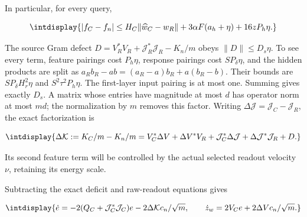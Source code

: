 
In particular, for every query,


\begingroup\renewcommand{\theHequation}{intdisplay.592}
\begin{equation}
\intdisplay{
|f_C-f_n|\le
 H_C\|\widehat w_C-w_R\|+3\alpha F(a_h+\eta)+16zP_h\eta.
}
\label{int:eq-0250-harmonic-query-output-difference}
\end{equation}
\endgroup


The source Gram defect \(D=V_R^*V_R+\mathcal J_R^*\mathcal J_R-K_n/m\) obeys \(\|D\|\le D_s\eta\). To see every term, feature pairings cost \(P_h\eta\), response pairings cost \(SP_\delta\eta\), and the hidden products are split as \(a_Rb_R-ab=(a_R-a)b_R+a(b_R-b)\). Their bounds are \(SP_\delta H_r^2\eta\) and \(S^2\tau^2P_h\eta\). The first-layer input pairing is at most one. Summing gives exactly \(D_s\). A matrix whose entries have magnitude at most \(d\) has operator norm at most \(md\); the normalization by \(m\) removes this factor. Writing \(\Delta\mathcal J=\mathcal J_C-\mathcal J_R\), the exact factorization is


\begingroup\renewcommand{\theHequation}{intdisplay.593}
\begin{equation}
\intdisplay{
\Delta\mathcal K:=K_C/m-K_n/m
 =V_C^*\Delta V+\Delta V^*V_R
   +\mathcal J_C^*\Delta\mathcal J
   +\Delta\mathcal J^*\mathcal J_R+D.
}
\label{int:eq-0251-harmonic-factored-gram-difference}
\end{equation}
\endgroup


Its second feature term will be controlled by the actual selected readout velocity \(\nu\), retaining its energy scale.



Subtracting the exact deficit and raw-readout equations gives


\begingroup\renewcommand{\theHequation}{intdisplay.594}
\begin{equation*}
\intdisplay{
\dot e=-2(Q_C+\mathcal J_C^*\mathcal J_C)e
                -2\Delta\mathcal Kc_n/\sqrt m,
\qquad \dot z_w=2V_Ce+2\Delta Vc_n/\sqrt m.
}
\end{equation*}
\endgroup


